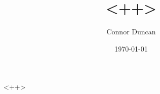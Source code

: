 \documentclass[12pt]{article}
\author{Connor Duncan}
\title{<++>}
\date{\today}
\begin{document}
\maketitle
<++>
\end{document}
